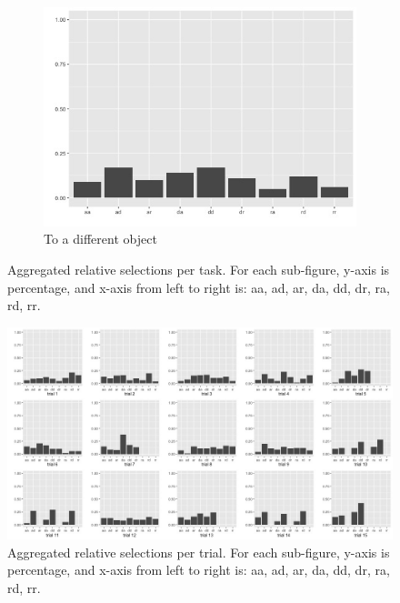 \documentclass{article}
\begin{document}
\begin{figure}[h!]
\begin{subfigure}[t]{0.25\textwidth}
    \includegraphics[width=\linewidth]{sim_agg_g5} 
    \caption{To a different object} \label{fig:sim_agg_g5}
  \end{subfigure}
  \caption{Aggregated relative selections per task. For each sub-figure, y-axis is percentage, and x-axis from left to right is: aa, ad, ar, da, dd, dr, ra, rd, rr.}
  \label{fig:sim_agg_groups}
\end{figure}

\begin{figure}[h!]
  \centering
  \includegraphics[width=.8\linewidth]{sim_agg_trials}
  \caption{Aggregated relative selections per trial. For each sub-figure, y-axis is percentage, and x-axis from left to right is: aa, ad, ar, da, dd, dr, ra, rd, rr.}
  \label{fig:sim_agg_trials}
\end{figure}
\end{document}
